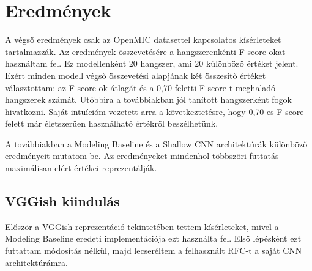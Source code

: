 \section{Eredmények}

A végső eredmények csak az OpenMIC datasettel kapcsolatos kísérleteket tartalmazzák. Az eredmények összevetésére a hangszerenkénti F score-okat használtam fel. Ez modellenként 20 hangszer, ami 20 különböző értéket jelent. Ezért minden modell végső összevetési alapjának két összesítő értéket választottam: az F-score-ok átlagát és a 0,70 feletti F score-t meghaladó hangszerek számát. Utóbbira a továbbiakban jól tanított hangszerként fogok hivatkozni. Saját intuícióm vezetett arra a következtetésre, hogy 0,70-es F score felett már életszerűen használható értékről beszélhetünk.

A továbbiakban a Modeling Baseline és a Shallow CNN architektúrák különböző eredményeit mutatom be. Az eredményeket mindenhol többszöri futtatás maximálisan elért értékei reprezentálják.

\subsection{VGGish kiindulás}

Először a VGGish reprezentáció tekintetében tettem kísérleteket, mivel a Modeling Baseline eredeti implementációja ezt használta fel. Első lépésként ezt futtattam módosítás nélkül, majd lecseréltem a felhasznált RFC-t a saját CNN architektúrámra.

